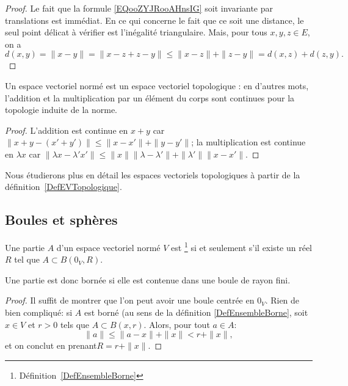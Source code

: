 \begin{proof}
    Le fait que la formule \eqref{EQooZYJRooAHnsIG} soit invariante par translations est immédiat. En ce qui concerne le fait que ce soit une distance, le seul point délicat à vérifier est l'inégalité triangulaire. Mais, pour tous \( x, y, z \in E\), on a
    \begin{equation}
            d(x,y)=\| x-y \| = \| x-z+z-y \|  \leq\| x - z \|+\| z - y\| =d(x,z)+d(z,y).
    \end{equation}
\end{proof}


\begin{proposition}
Un espace vectoriel normé est un espace vectoriel topologique : en d'autres mots, l'addition et la multiplication par un élément du corps sont continues pour la topologie induite de la norme.
\end{proposition}

\begin{proof}
  L'addition est continue en \( x + y \) car \( \| x + y - (x' + y') \| \leq \|x - x' \| + \| y - y' \|  \); la multiplication est continue en \( \lambda x \) car  \( \| \lambda x - \lambda' x' \| \leq \| x \| \| \lambda - \lambda' \| + \| \lambda' \| \| x - x' \| \).
\end{proof}

Nous étudierons plus en détail les espaces vectoriels topologiques à partir de la définition~\ref{DefEVTopologique}.

\subsection{Boules et sphères}

\begin{proposition}\label{PropEnsembleBorneEVN}
	Une partie $A$ d'un espace vectoriel normé $V$ est \footnote{Définition~\ref{DefEnsembleBorne}} si et seulement s'il existe un réel $R$ tel que $A\subset B(0_V,R)$.
\end{proposition}
Une partie est donc bornée si elle est contenue dans une boule de rayon fini.
\begin{proof}
  Il suffit de montrer que l'on peut avoir une boule centrée en \( 0_V \). Rien de bien compliqué: si \(A \) est borné (au sens de la définition \ref{DefEnsembleBorne}, soit \( x \in V\) et \( r > 0 \) tels que \( A \subset B(x, r) \). Alors, pour tout \(a \in A\):
  \begin{equation}
    \| a \| \leq \| a - x \| + \| x \| < r + \|x \|,
  \end{equation}
et on conclut en prenant\( R = r + \| x \| \).
\end{proof}



